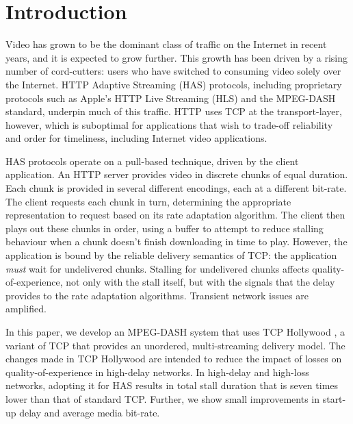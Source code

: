 \section{Introduction}


Video has grown to be the dominant class of traffic on the Internet in recent
years, and it is expected to grow further. This growth has been driven by a rising number
of cord-cutters: users who have switched to consuming video solely over the Internet. HTTP
Adaptive Streaming (HAS) protocols, including proprietary protocols such as Apple's HTTP Live
Streaming (HLS) and the MPEG-DASH standard, underpin much of this traffic.  HTTP uses TCP
at the transport-layer, however, which is suboptimal for applications that wish to trade-off
reliability and order for timeliness, including Internet video applications.


HAS protocols operate on a pull-based technique, driven by the client application. An HTTP
server provides video in discrete chunks of equal duration. Each chunk is provided in several 
different encodings, each at a different bit-rate. The client requests each chunk in turn, 
determining the
appropriate representation to request based on its rate adaptation algorithm. The client
then plays out these chunks in order, using a buffer to attempt to reduce stalling
behaviour when a chunk doesn't finish downloading in time to play. However, the application 
is bound by the reliable delivery
semantics of TCP: the application \emph{must} wait for undelivered chunks. Stalling for
undelivered chunks affects quality-of-experience, not only with the stall itself, but with
the signals that the delay provides to the rate adaptation algorithms. Transient network
issues are amplified.


In this paper, we develop an MPEG-DASH system that uses TCP Hollywood
\cite{mcquistin2016tcp,mcquistin2016tcp2}, a variant of TCP
that provides an unordered, multi-streaming delivery model. The changes made in
TCP Hollywood are intended to reduce the impact of
losses on quality-of-experience in high-delay networks. In high-delay and high-loss networks, 
adopting it for HAS results in total stall duration that is seven times lower than that of 
standard TCP.
Further, we show small improvements in start-up delay and average media bit-rate.

